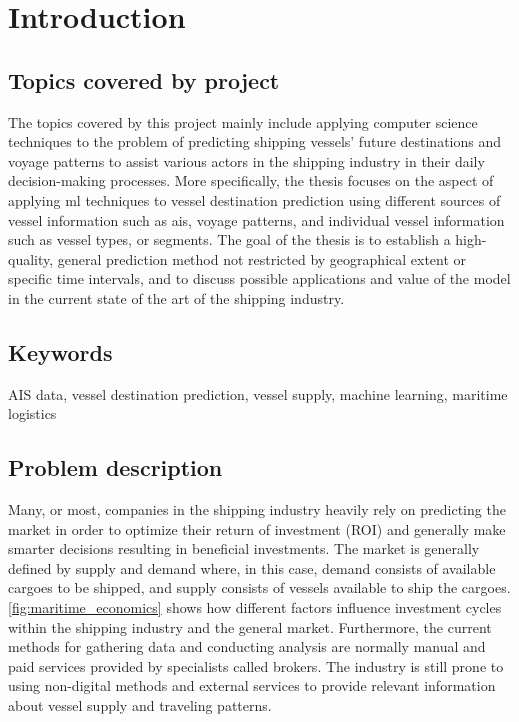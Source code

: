 \chapter{Introduction}

\section{Topics covered by project}
\label{sec:topics_covered}

The topics covered by this project mainly include applying computer science techniques to the problem of predicting shipping vessels' future destinations and \gls{voyage} patterns to assist various actors in the shipping industry in their daily decision-making processes. More specifically, the thesis focuses on the aspect of applying \acrfull{ml} techniques to vessel destination prediction using different sources of vessel information such as \acrfull{ais}, \gls{voyage} patterns, and individual vessel information such as vessel types, or segments. The goal of the thesis is to establish a high-quality, general prediction method not restricted by geographical extent or specific time intervals, and to discuss possible applications and value of the model in the current state of the art of the shipping industry.

\section{Keywords}

AIS data, vessel destination prediction, vessel supply, machine learning, maritime logistics

\section{Problem description}
\label{sec:problem_desc}

Many, or most, companies in the shipping industry heavily rely on predicting the market in order to optimize their return of investment (ROI) and generally make smarter decisions resulting in beneficial investments. The market is generally defined by supply and demand where, in this case, demand consists of available cargoes to be shipped, and supply consists of vessels available to ship the cargoes. \cref{fig:maritime_economics} shows how different factors influence investment cycles within the shipping industry and the general market. Furthermore, the current methods for gathering data and conducting analysis are normally manual and paid services provided by specialists called brokers. The industry is still prone to using non-digital methods and external services to provide relevant information about vessel supply and traveling patterns.

